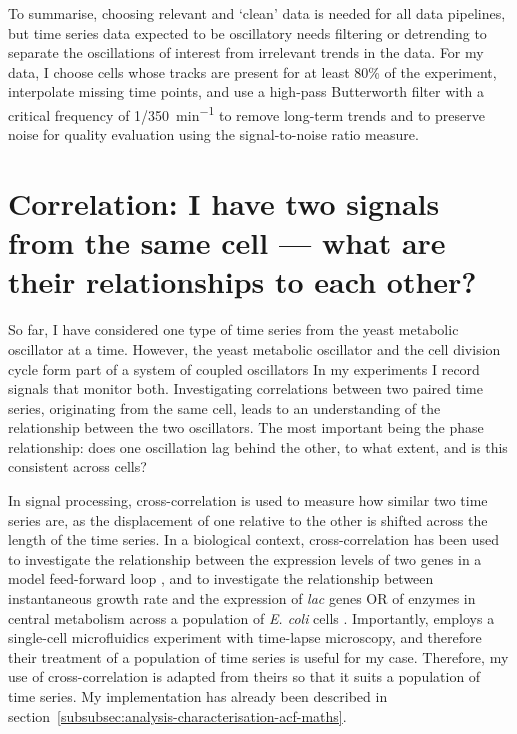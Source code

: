 To summarise, choosing relevant and `clean' data is needed for all data pipelines, but time series data expected to be oscillatory needs filtering or detrending to separate the oscillations of interest from irrelevant trends in the data.
For my data, I choose cells whose tracks are present for at least 80\% of the experiment, interpolate missing time points, and use a high-pass Butterworth filter with a critical frequency of \SI[parse-numbers=false]{1/350}{\minute^{-1}} to remove long-term trends and to preserve noise for quality evaluation using the signal-to-noise ratio measure.


\section[Correlation]{Correlation: I have two signals from the same cell --- what are their relationships to each other?}
\label{sec:analysis-correlation}

So far, I have considered one type of time series from the yeast metabolic oscillator at a time.
However, the yeast metabolic oscillator and the cell division cycle form part of a system of coupled oscillators
In my experiments I record signals that monitor both.
Investigating correlations between two paired time series, originating from the same cell, leads to an understanding of the relationship between the two oscillators.
The most important being the phase relationship: does one oscillation lag behind the other, to what extent, and is this consistent across cells?


In signal processing, cross-correlation is used to measure how similar two time series are, as the displacement of one relative to the other is shifted across the length of the time series.
In a biological context, cross-correlation has been used to investigate the relationship between the expression levels of two genes in a model feed-forward loop \parencite{dunlopRegulatoryActivityRevealed2008},
and to investigate the relationship between instantaneous growth rate and the expression of \textit{lac} genes OR of enzymes in central metabolism across a population of \textit{E. coli} cells \parencite{kivietStochasticityMetabolismGrowth2014}.
Importantly, \textcite{kivietStochasticityMetabolismGrowth2014} employs a single-cell microfluidics experiment with time-lapse microscopy, and therefore their treatment of a population of time series is useful for my case.
Therefore, my use of cross-correlation is adapted from theirs so that it suits a population of time series.
My implementation has already been described in section~\ref{subsubsec:analysis-characterisation-acf-maths}.

